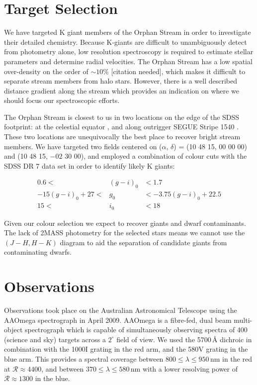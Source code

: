 \documentclass{emulateapj}
\begin{document}
\section{Target Selection}
\label{sec:target-selection}

We have targeted K giant members of the Orphan Stream in order to investigate their detailed chemistry. Because K-giants are difficult to unambiguously detect from photometry alone, low resolution spectroscopy is required to estimate stellar parameters and determine radial velocities. The Orphan Stream has a low spatial over-density on the order of $\sim10\%$ [citation needed], which makes it difficult to separate stream members from halo stars. However, there is a well described distance gradient along the stream \citep{Belokurov;et-al_2007, Newberg;et-al_2010} which provides an indication on where we should focus our spectroscopic efforts.

The Orphan Stream is closest to us in two locations on the edge of the SDSS footprint: at the celestial equator \citep{Belokurov;et-al_2007}, and along outrigger SEGUE Stripe 1540 \citep{Newberg;et-al_2010}. These two locations are unequivocally the best place to recover bright stream members. We have targeted two fields centered on ($\alpha$, $\delta$) = (10 48 15, 00 00 00) and (10 48 15, $-02$ 30 00), and employed a combination of colour cuts with the SDSS DR 7 \citep{Abazajian;et-al_2009} data set in order to identify likely K giants:

\begin{eqnarray}
0.6 <& (g-i)_0 &< 1.7 \\
-15(g-i)_0 + 27 <& g_0 &< -3.75(g-i)_0 + 22.5 \\
15  <& i_0  &< 18 
\end{eqnarray}

Given our colour selection we expect to recover giants and dwarf contaminants. The lack of 2MASS photometry for the selected stars means we cannot use the $(J-H, H-K)$ diagram to aid the separation of candidate giants from contaminating dwarfs.

\section{Observations}
\label{sec:observations}

Observations took place on the Australian Astronomical Telescope using the AAOmega spectrograph in April 2009. AAOmega is a fibre-fed, dual beam multi-object spectrograph which is capable of simultaneously observing spectra of 400 (science and sky) targets across a $2^\circ$ field of view. We used the 5700\,{\AA} dichroic in combination with the 1000I grating in the red arm, and the 580V grating in the blue arm. This provides a spectral coverage between $800 \leq \lambda \leq 950$\,nm in the red at $\mathcal{R} \approx 4400$, and between $370 \leq \lambda \leq 580$\,nm with a lower resolving power of $\mathcal{R} \approx 1300$ in the blue.
\end{document}
